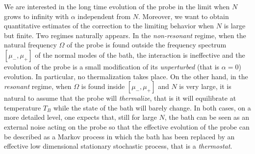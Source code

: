 \documentclass[11pt]{article}
\numberwithin{equation}{section}
\def\red{\textcolor{red}}
\def\red{}
\numberwithin{theorem}{section}
\begin{document}
We are interested in the long time evolution of the probe in the limit when $N$ grows to infinity with $\alpha$
independent from $N$. \red{Moreover, we want to obtain quantitative estimates of the correction to the limiting behavior
when $N$ is large but finite}. Two regimes naturally appears. In the {\it non-resonant} regime, when the natural
frequency $\Omega$ of the probe is found outside the frequency spectrum $[\mu_-,\mu_+]$ of the normal modes of the bath,
the interaction is ineffective and the evolution of the probe is a small modification of its {\it unperturbed} (that is
$\alpha=0$) evolution. In particular, no thermalization takes place. On the other hand, in the {\it resonant} regime,
when $\Omega$ is found inside $[\mu_-,\mu_+]$ and $N$ is very large, it is natural to assume that the probe will {\it
thermalize}, that is it will equilibrate at temperature $T_B$ while the state of the bath will barely change. In both
cases, on a more detailed level, one expects that, still for large $N$, the bath can be seen as an external noise acting
on the probe so that the effective evolution of the probe can be described as a Markov process in which the bath has
been replaced by an effective low dimensional stationary stochastic process, that is a {\it thermostat}.
\end{document}

